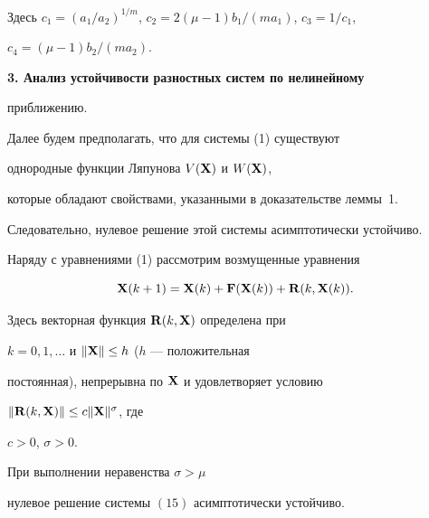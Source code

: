 Здесь $c_1=(a_1/a_2)^{1/m}$, $c_2=2(\mu-1)b_1/(ma_1)$, $c_3=1/c_1$,


$c_4=(\mu-1)b_2/(ma_2)$.


\medskip





{\bf 3. Анализ устойчивости разностных систем по нелинейному


приближению.} Далее будем предполагать, что для системы (1) существуют


однородные функции Ляпунова $V(\bold X)$ и $W(\bold X)$,


которые обладают свойствами, указанными в доказательстве леммы~1.


Следовательно, нулевое решение этой системы асимптотически устойчиво.





Наряду с уравнениями (1) рассмотрим возмущенные уравнения


\begin{equation}


\bold X(k+1)=\bold X(k)+\bold F(\bold X(k))+\bold R(k,\bold X(k)).


\end{equation}


Здесь векторная функция $\bold R(k,\bold X)$ определена при


$k=0,1,\dotsc$ и $\|\bold X\|\leq h$ ($h$ --- положительная


постоянная), непрерывна по $\bold X$ и удовлетворяет условию


$\|\bold R(k,\bold X)\|\leq c \|\bold X\|^\sigma$, где


$c>0$, $\sigma>0$.





\begin{thm}


При выполнении неравенства $\sigma>\mu$


нулевое решение системы $(15)$ асимптотически устойчиво.


\end{thm}





